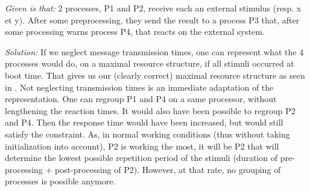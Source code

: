 \documentclass[../main.tex]{subfiles}
\begin{document}
\begin{exmp}
\emph{Given is that:} 2 processes, P1 and P2, receive each an external stimulus (resp. x et y). After some preprocessing, they send the result to a process P3 that, after some processing warns process P4, that reacts on the external system. %

\emph{Solution:} If we neglect message transmission times, one can represent what the 4 processes would do, on a maximal resource structure, if all stimuli occurred at boot time.
That gives us our (clearly correct) maximal resource structure as seen in .
Not neglecting transmission times is an immediate adaptation of the representation. One can regroup P1 and P4 on a same processor, without lengthening the reaction times. It would also have been possible to regroup P2 and P4. Then the response time would have been increased, but would still satisfy the constraint.
As, in normal working conditions (thus without taking initialization into account), P2 is working the most, it will be P2 that will determine the lowest possible repetition period of the stimuli (duration of pre-processing + post-processing of P2). However, at that rate, no grouping of processes is possible anymore.



\end{exmp}
\end{document}

